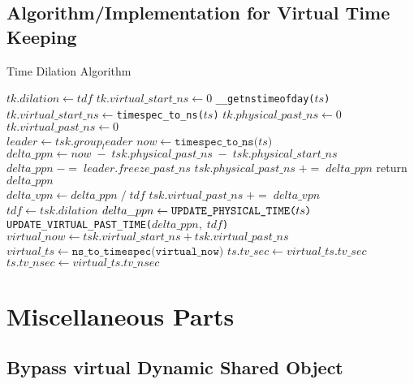 \documentclass{acm_proc_article-sp}
\begin{document}
\subsection{Algorithm/Implementation for Virtual Time Keeping}
\begin{algorithm*}[t]
\caption{Time Dilation Algorithm}%
\label{Alg-DilateTimeKeeping}
\begin{algorithmic}[1]
    \State $tk.dilation \gets tdf$
    \State $tk.virtual\_start\_ns \gets 0$
    \State \texttt{\_\_getnstimeofday($ts$)}
    \State $tk.virtual\_start\_ns \gets $\texttt{timespec\_to\_ns($ts$)}
    \State $tk.physical\_past\_ns \gets 0$
    \State $tk.virtual\_past\_ns \gets 0$
\EndIf
\EndFunction
\\
\State $leader \gets tsk.group_leader$
\State $now \gets \texttt{timespec\_to\_ns($ts$)}$
\State $delta\_ppn \gets now \; - \; tsk.physical\_past\_ns \; - \; tsk.physical\_start\_ns$
\State $delta\_ppn \; -= \; leader.freeze\_past\_ns$
\State $tsk.physical\_past\_ns \; += \; delta\_ppn$
\State return $delta\_ppn$
\EndFunction
\\
	\State $delta\_vpn \gets delta\_ppn \; / \; tdf$
	\State $tsk.virtual\_past\_ns \; += \; delta\_vpn$
\EndIf
\EndFunction
\\
	\State $tdf \gets tsk.dilation$
	\State $delta\_ppn \gets \texttt{\uppercase{update\_physical\_time}($ts$)}$
	\State \texttt{\uppercase{update\_virtual\_past\_time}($delta\_ppn, \;tdf$)}
	\State $virtual\_now \gets tsk.virtual\_start\_ns + tsk.virtual\_past\_ns$
	\State $virtual\_ts \gets \texttt{ns\_to\_timespec(virtual\_now)}$
	\State $ts.tv\_sec \gets virtual\_ts.tv\_sec$
	\State $ts.tv\_nsec \gets virtual\_ts.tv\_nsec$
\EndIf
\EndFunction
\end{algorithmic}
\end{algorithm*}

\section{Miscellaneous Parts}
\subsection{Bypass virtual Dynamic Shared Object}
\end{document}

